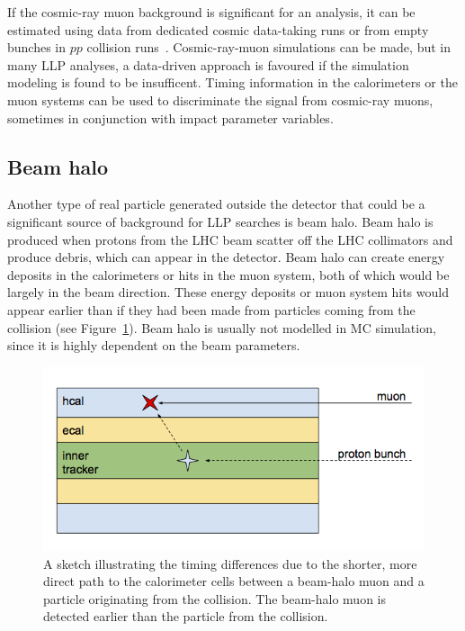 If the cosmic-ray muon background is significant for an analysis, it can be estimated using data from dedicated cosmic data-taking runs or from empty bunches in $pp$ collision runs~\cite{Khachatryan:2015jha, Chatrchyan:2012dxa, Khachatryan:2010uf}. Cosmic-ray-muon simulations can be made, but in many LLP analyses, a data-driven approach is favoured if the simulation modeling is found to be insufficent. Timing information in the calorimeters or the muon systems can be used to discriminate the signal from  cosmic-ray muons, sometimes in conjunction with impact parameter variables.

\subsection{Beam halo} %

Another type of real particle generated outside the detector that could be a significant source of background for LLP searches is beam halo. Beam halo is produced when protons from the LHC beam scatter off the LHC collimators and produce debris, which can appear in the detector. Beam halo can create energy deposits in the calorimeters or hits in the muon system, both of which would be largely in the beam direction. These energy deposits or muon system hits would appear earlier than if they had been made from particles coming from the collision (see Figure~\ref{fig:beamHaloSketch}). Beam halo is usually not modelled in MC simulation, since it is highly dependent on the beam parameters.

\begin{figure}[t]
  \centering
  \includegraphics[width=\textwidth]{figures/beamHaloSketch.png}
  \caption{A sketch illustrating the timing differences due to the shorter, more direct path to the calorimeter cells between a beam-halo muon and a particle originating from the collision. The beam-halo muon is detected earlier than the particle from the collision.}
  \label{fig:beamHaloSketch}
\end{figure}

